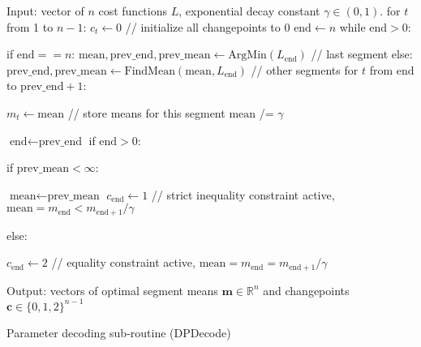 \documentclass{article}
\newcommand{\RR}{\mathbb R}
\begin{document}
\begin{algorithm}
  \begin{algorithmic}[1]
\STATE Input: vector of $n$ cost functions $L$, 
exponential decay constant $\gamma\in(0,1)$.
\STATE for $t$ from 1 to $n-1$: $c_t\gets 0$ 
\label{line:init-c-0}
// initialize all changepoints to 0
\STATE $\text{end}\gets n$
\STATE while $\text{end} > 0$:
\label{line:while}
\begin{ALC@g}
  \STATE if $\text{end} == n$:
 $\text{mean},\text{prev\_end},\text{prev\_mean} 
\gets \text{ArgMin}(L_{\text{end}})$ // last segment
  \label{line:op-ArgMin}
  \STATE else:
 $\text{prev\_end},\text{prev\_mean}
\gets\text{FindMean}(\text{mean}, L_{\text{end}})$ // other segments
  \label{line:op-FindMean}
  \STATE for $t$ from $\text{end}$ to $\text{prev\_end}+1$: 
  \label{line:for-store-means}
  \begin{ALC@g}
    \STATE $m_t\gets \text{mean}$ // store means for this segment
    \STATE $\text{mean}$ /= $\gamma$
    \label{line:divide-mean}
  \end{ALC@g}
  \STATE $\text{end}\gets\text{prev\_end}$
  \STATE if $\text{end}>0$:
  \begin{ALC@g}
    \STATE if $\text{prev\_mean} < \infty$: 
    \label{line:check-inf}
    \begin{ALC@g}
      \STATE $\text{mean}\gets \text{prev\_mean}$ 
      \STATE $c_{\text{end}}\gets 1$
      \label{line:c-1}
      // strict inequality constraint active,
$\text{mean}=m_{\text{end}}<m_{\text{end}+1}/\gamma $
    \end{ALC@g}
    \STATE else:
    \begin{ALC@g}
      \STATE $c_{\text{end}}\gets 2$
      \label{line:c-2}
      // equality constraint active,
 $\text{mean}=m_{\text{end}}=m_{\text{end}+1}/\gamma $
    \end{ALC@g}
  \end{ALC@g}
\label{line:op-i+1}
\end{ALC@g}
\STATE Output: 
vectors of optimal segment means $\mathbf m\in\RR^{n}$ 
and changepoints $\mathbf c\in\{0,1,2\}^{n-1}$
    \caption{\label{algo:decode}Parameter decoding sub-routine
 (DPDecode)}
  \end{algorithmic}
\end{algorithm}
\end{document}
